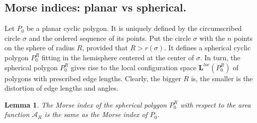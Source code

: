 \documentclass[12pt]{amsart}
\theoremstyle{plain}
\newtheorem{lemma}{Lemma}
\theoremstyle{definition}
\theoremstyle{remark}
\theoremstyle{plain}
\theoremstyle{definition}
\begin{document}
\subsection*{Morse indices: planar vs spherical.}

Let $P_0$ be a planar cyclic polygon. It is uniquely defined by the circumscribed circle $\sigma$ and the ordered sequence of its points. Put the circle $\sigma$ with the $n$ points on the sphere of radius $R$, provided that $R>r(\sigma)$. It defines a spherical cyclic polygon $P_0^R$ fitting in the hemisphere centered at the center of  $\sigma$. In turn, the spherical polygon $P_0^R$  gives rise to the local configuration space $\mathbf{L}^{loc}(P_0^R)$ of polygons  with prescribed edge lengths. Clearly, the bigger $R$ is, the smaller is the distortion of edge lengths and angles.



\begin{lemma}\label{LemmaBifurkFree}
The Morse index of  the spherical polygon $P_0^R$ with respect to the area function $\mathcal{A}_R$ is the same as the Morse index of $P_0$.
\end{lemma}
\end{document}
